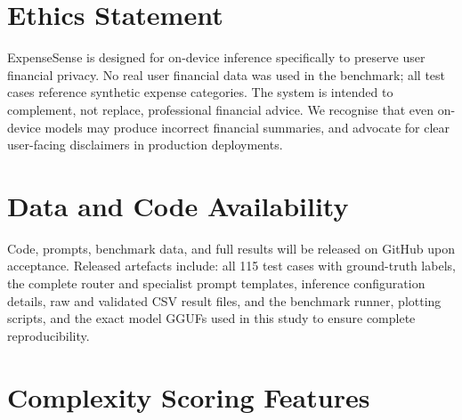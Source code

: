 \documentclass[11pt,twocolumn]{article}
\begin{document}
\vspace{-2pt}
\section*{Ethics Statement}

ExpenseSense is designed for on-device inference specifically to
preserve user financial privacy.
No real user financial data was used in the benchmark; all test cases
reference synthetic expense categories.
The system is intended to complement, not replace, professional
financial advice.
We recognise that even on-device models may produce incorrect
financial summaries, and advocate for clear user-facing disclaimers in
production deployments.

\vspace{-6pt}
\section*{Data and Code Availability}
\vspace{-3pt}

Code, prompts, benchmark data, and full results will be released on
GitHub upon acceptance.
Released artefacts include: all 115 test cases with ground-truth
labels, the complete router and specialist prompt templates, inference
configuration details, raw and validated CSV result files, and the
benchmark runner, plotting scripts, and the exact model GGUFs used in
this study to ensure complete reproducibility.

\vspace{-2pt}
\begingroup
\small
\let\oldthebibliography\thebibliography
\renewcommand{\thebibliography}[1]{%
  \oldthebibliography{#1}%
  \setlength{\itemsep}{0.5pt plus 0.5pt}%
  \setlength{\parskip}{0pt}%
}

\endgroup

\appendix\onecolumn

\section{Complexity Scoring Features}
\label{sec:complexity_appendix}
\end{document}
